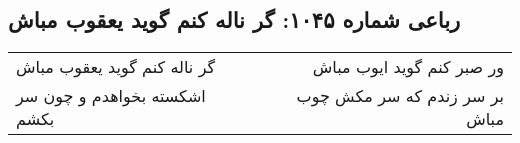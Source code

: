 \begin{center}
\section*{رباعی شماره ۱۰۴۵: گر ناله کنم گوید یعقوب مباش}
\label{sec:1045}
\begin{longtable}{l p{0.5cm} r}
گر ناله کنم گوید یعقوب مباش
&&
ور صبر کنم گوید ایوب مباش
\\
اشکسته بخواهدم و چون سر بکشم
&&
بر سر زندم که سر مکش چوب مباش
\\
\end{longtable}
\end{center}
